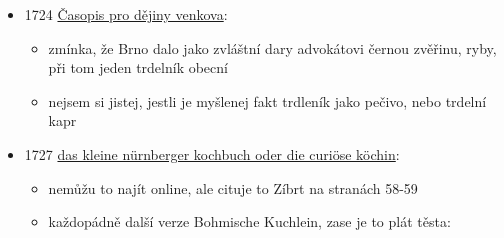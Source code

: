 \begin{itemize}
\begin{itemize}
\begin{itemize}
      \begin{itemize}
      \tightlist
      \item
        perec = preclík
      \item
        béles = koláč s náplní, sladký nebo slaný
      \item
        rétes = závin
      \item
        pogácsa = pagáč, slané pečivo
      \item
        nyárson sütött = pečený na rožni
      \item
        rátottán (dnes rántottan) = smažený
      \item
        kívül = kromě
      \end{itemize}
    \end{itemize}
  \item
    s. XXXIII:

    \begin{itemize}
    \tightlist
    \item
      obélias, ae: f. i. der Spieskuche /
    \item
      nyárfon sütött béles,
    \item
      wagečnjk,
      \protect{}\label{naux20trdleux20ux2fux20koluxe1ux10d}{}\textbf{na
      trdle / koláč}!!!
    \end{itemize}
  \end{itemize}
\item
  1724
  \href{https://www.google.cz/books/edition/\%C4\%8Casopis_pro_d\%C4\%9Bjiny_venkova/2-ciAQAAIAAJ?hl=en&gbpv=1&bsq=trdeln\%C3\%ADk&dq=trdeln\%C3\%ADk&printsec=frontcover}{Časopis
  pro dějiny venkova}:

  \begin{itemize}
  \tightlist
  \item
    zmínka, že Brno dalo jako zvláštní dary advokátovi černou zvěřinu,
    ryby, při tom jeden trdelník obecní
  \item
    nejsem si jistej, jestli je myšlenej fakt trdleník jako pečivo, nebo
    trdelní kapr
  \end{itemize}
\item
  1727
  \href{https://ndk.cz/uuid/uuid:b59a1ff0-9f23-11ea-b6e0-005056827e51}{das
  kleine nürnberger kochbuch oder die curiöse köchin}:

  \begin{itemize}
  \tightlist
  \item
    nemůžu to najít online, ale cituje to Zíbrt na stranách 58-59
  \item
    každopádně další verze Bohmische Kuchlein, zase je to plát těsta:


\end{itemize}
\end{itemize}
